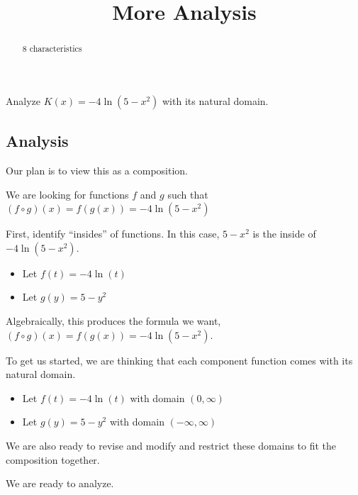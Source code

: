 \documentclass{ximera}
\title{More Analysis}
\begin{document}
\begin{abstract}
8 characteristics
\end{abstract}
\maketitle












Analyze $K(x) = -4 \ln(5 - x^2)$ with its natural domain. 




\subsection*{Analysis}





Our plan is to view this as a composition. 





We are looking for functions $f$ and $g$ such that $(f \circ g)(x) = f(g(x)) = -4 \ln(5 - x^2)$ 


First, identify ``insides'' of functions.  In this case, $5 - x^2$ is the inside of $-4 \ln(5 - x^2)$. 



\begin{itemize}
\item Let $f(t) = -4 \ln(t)$ 
\item Let $g(y) = 5 - y^2$ 
\end{itemize}

Algebraically, this produces the formula we want, $(f \circ g)(x) = f(g(x)) = -4 \ln(5 - x^2)$.


To get us started, we are thinking that each component function comes with its natural domain.

\begin{itemize}
\item Let $f(t) = -4 \ln(t)$ with domain $(0, \infty)$ 
\item Let $g(y) = 5 - y^2$ with domain $(-\infty, \infty)$ 
\end{itemize}

We are also ready to revise and modify and restrict these domains to fit the composition together. 




We are ready to analyze. 
\end{document}
